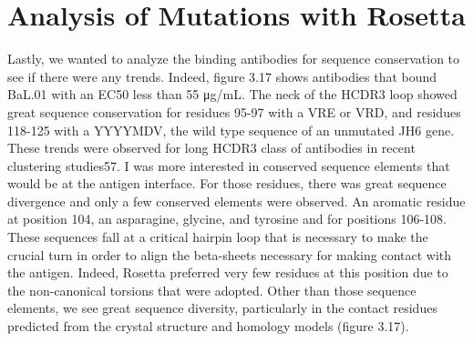 \section{Analysis of Mutations with Rosetta}
Lastly, we wanted to analyze the binding antibodies for sequence conservation to see if there were any trends. Indeed, figure 3.17 shows antibodies that bound BaL.01 with an EC50 less than 55 μg/mL. The neck of the HCDR3 loop showed great sequence conservation for residues 95-97 with a VRE or VRD, and residues 118-125 with a YYYYMDV, the wild type sequence of an unmutated JH6 gene. These trends were observed for long HCDR3 class of antibodies in recent clustering studies57. I was more interested in conserved sequence elements that would be at the antigen interface. For those residues, there was great sequence divergence and only a few conserved elements were observed. An aromatic residue at position 104, an asparagine, glycine, and tyrosine and for positions 106-108. These sequences fall at a critical hairpin loop that is necessary to make the crucial turn in order to align the beta-sheets necessary for making contact with the antigen. Indeed, Rosetta preferred very few residues at this position due to the non-canonical torsions that were adopted. Other than those sequence elements, we see great sequence diversity, particularly in the contact residues predicted from the crystal structure and homology models (figure 3.17).

